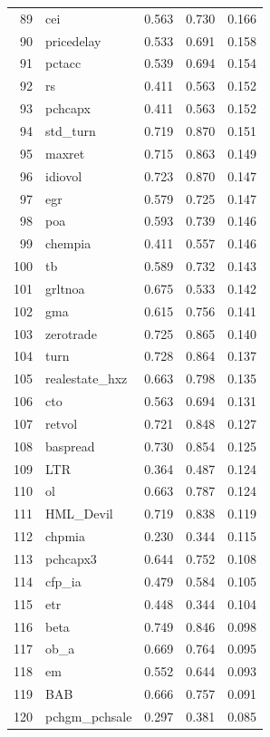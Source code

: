 \documentclass[12pt]{article}
\begin{document}
\begin{footnotesize}
\begin{longtable}{rl|c|c|c}
		89 & cei & 0.563 & 0.730 & 0.166 \\ 
		90 & pricedelay & 0.533 & 0.691 & 0.158 \\ 
		91 & pctacc & 0.539 & 0.694 & 0.154 \\ 
		92 & rs & 0.411 & 0.563 & 0.152 \\ 
		93 & pchcapx & 0.411 & 0.563 & 0.152 \\ 
		94 & std\_turn & 0.719 & 0.870 & 0.151 \\ 
		95 & maxret & 0.715 & 0.863 & 0.149 \\ 
		96 & idiovol & 0.723 & 0.870 & 0.147 \\ 
		97 & egr & 0.579 & 0.725 & 0.147 \\ 
		98 & poa & 0.593 & 0.739 & 0.146 \\ 
		99 & chempia & 0.411 & 0.557 & 0.146 \\ 
		100 & tb & 0.589 & 0.732 & 0.143 \\ 
		101 & grltnoa & 0.675 & 0.533 & 0.142 \\ 
		102 & gma & 0.615 & 0.756 & 0.141 \\ 
		103 & zerotrade & 0.725 & 0.865 & 0.140 \\ 
		104 & turn & 0.728 & 0.864 & 0.137 \\ 
		105 & realestate\_hxz & 0.663 & 0.798 & 0.135 \\ 
		106 & cto & 0.563 & 0.694 & 0.131 \\ 
		107 & retvol & 0.721 & 0.848 & 0.127 \\ 
		108 & baspread & 0.730 & 0.854 & 0.125 \\ 
		109 & LTR & 0.364 & 0.487 & 0.124 \\ 
		110 & ol & 0.663 & 0.787 & 0.124 \\ 
		111 & HML\_Devil & 0.719 & 0.838 & 0.119 \\ 
		112 & chpmia & 0.230 & 0.344 & 0.115 \\ 
		113 & pchcapx3 & 0.644 & 0.752 & 0.108 \\ 
		114 & cfp\_ia & 0.479 & 0.584 & 0.105 \\ 
		115 & etr & 0.448 & 0.344 & 0.104 \\ 
		116 & beta & 0.749 & 0.846 & 0.098 \\ 
		117 & ob\_a & 0.669 & 0.764 & 0.095 \\ 
		118 & em & 0.552 & 0.644 & 0.093 \\ 
		119 & BAB & 0.666 & 0.757 & 0.091 \\ 
		120 & pchgm\_pchsale & 0.297 & 0.381 & 0.085 \\ 

\end{longtable}
\end{footnotesize}
\end{document}
